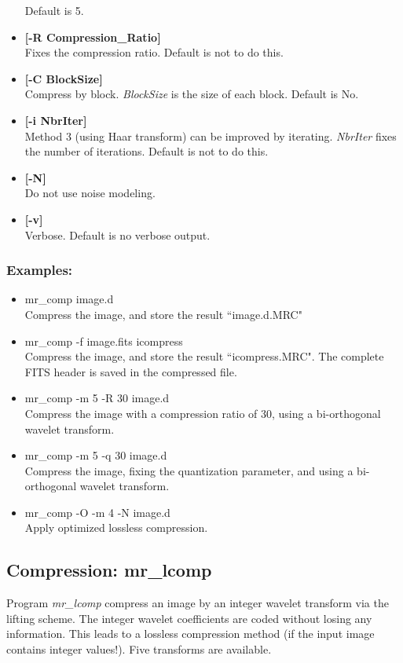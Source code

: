 \begin{itemize}
 Default is 5.
\item {\bf [-R Compression\_Ratio]} \\
 Fixes the compression ratio. Default is not to do this.
\item {\bf [-C BlockSize] } \\
Compress by block. {\em BlockSize} is the size of each block.
Default is No.
\item {\bf [-i NbrIter]} \\
Method 3 (using Haar transform) can be improved by iterating. {\em NbrIter}
fixes the number of iterations. Default is not to do this.
\item {\bf [-N]} \\
Do not use noise modeling.
\item {\bf [-v]} \\
Verbose. Default is no verbose output.

\end{itemize}
\subsubsection*{Examples:}
\begin{itemize}
\baselineskip=0.4truecm
\item mr\_comp image.d \\
Compress the image, and store the result ``image.d.MRC"
\item mr\_comp -f image.fits icompress\\
Compress the image, and store the result ``icompress.MRC". The
complete FITS header is saved in the compressed file.
\item mr\_comp -m 5 -R 30 image.d \\
Compress the image with a compression ratio of 30, using a bi-orthogonal
wavelet transform.
\item mr\_comp -m 5 -q 30 image.d \\
Compress the image, fixing the quantization parameter, and 
using a bi-orthogonal
wavelet transform.
\item mr\_comp -O -m 4 -N image.d \\
Apply optimized lossless compression.
\end{itemize}

\newpage
\subsection{Compression: mr\_lcomp}
Program {\em mr\_lcomp} compress an image by an integer 
wavelet transform via the lifting scheme. The integer wavelet 
coefficients are 
coded without losing any information. This leads to a lossless compression 
method (if the input image contains integer values!).  Five   
transforms are available.

